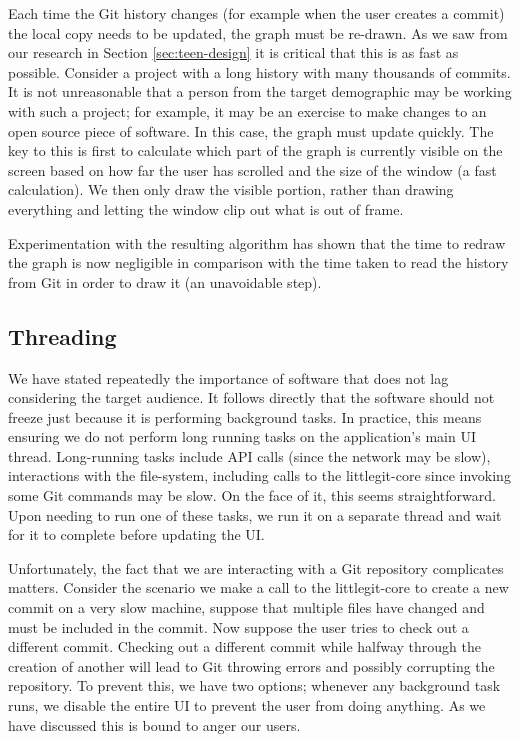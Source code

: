 
Each time the Git history changes (for example when the user creates a commit) the local copy needs to be updated, the graph must be re-drawn. As we saw from our research in Section \ref{sec:teen-design} it is critical that this is as fast as possible. Consider a project with a long history with many thousands of commits. It is not unreasonable that a person from the target demographic may be working with such a project; for example, it may be an exercise to make changes to an open source piece of software. In this case, the graph must update quickly. The key to this is first to calculate which part of the graph is currently visible on the screen based on how far the user has scrolled and the size of the window (a fast calculation). We then only draw the visible portion, rather than drawing everything and letting the window clip out what is out of frame.

Experimentation with the resulting algorithm has shown that the time to redraw the graph is now negligible in comparison with the time taken to read the history from Git in order to draw it (an unavoidable step).

\subsection{Threading}

We have stated repeatedly the importance of software that does not lag considering the target audience. It follows directly that the software should not freeze just because it is performing background tasks. In practice, this means ensuring we do not perform long running tasks on the application's main UI thread. Long-running tasks include API calls (since the network may be slow), interactions with the file-system, including calls to the littlegit-core since invoking some Git commands may be slow. On the face of it, this seems straightforward. Upon needing to run one of these tasks, we run it on a separate thread and wait for it to complete before updating the UI.

Unfortunately, the fact that we are interacting with a Git repository complicates matters. Consider the scenario we make a call to the littlegit-core to create a new commit on a very slow machine, suppose that multiple files have changed and must be included in the commit. Now suppose the user tries to check out a different commit. Checking out a different commit while halfway through the creation of another will lead to Git throwing errors and possibly corrupting the repository. To prevent this, we have two options; whenever any background task runs, we disable the entire UI to prevent the user from doing anything. As we have discussed this is bound to anger our users.

